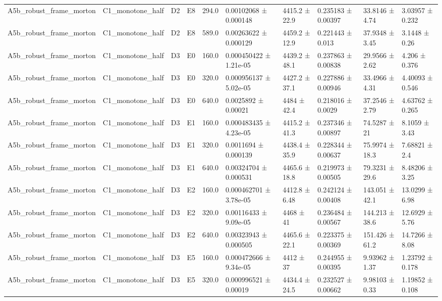 \begin{table}
\begin{tabular}{llllllllll}
A5b\_robust\_frame\_morton & C1\_monotone\_half & D2 & E8 & 294.0 & 0.00102068 ± 0.000148 & 4415.2 ± 22.9 & 0.235183 ± 0.00397 & 33.8146 ± 4.74 & 3.03957 ± 0.232 \\
A5b\_robust\_frame\_morton & C1\_monotone\_half & D2 & E8 & 589.0 & 0.00263622 ± 0.000129 & 4459.2 ± 12.9 & 0.221443 ± 0.013 & 37.9348 ± 3.45 & 3.1448 ± 0.26 \\
A5b\_robust\_frame\_morton & C1\_monotone\_half & D3 & E0 & 160.0 & 0.000450422 ± 1.21e-05 & 4439.2 ± 48.1 & 0.237863 ± 0.00838 & 29.9566 ± 2.62 & 4.206 ± 0.376 \\
A5b\_robust\_frame\_morton & C1\_monotone\_half & D3 & E0 & 320.0 & 0.000956137 ± 5.02e-05 & 4427.2 ± 37.1 & 0.227886 ± 0.00946 & 33.4966 ± 4.31 & 4.40093 ± 0.546 \\
A5b\_robust\_frame\_morton & C1\_monotone\_half & D3 & E0 & 640.0 & 0.0025892 ± 0.00021 & 4484 ± 42.4 & 0.218016 ± 0.0029 & 37.2546 ± 2.79 & 4.63762 ± 0.265 \\
A5b\_robust\_frame\_morton & C1\_monotone\_half & D3 & E1 & 160.0 & 0.000483435 ± 4.23e-05 & 4415.2 ± 41.3 & 0.237346 ± 0.00897 & 74.5287 ± 21 & 8.1059 ± 3.43 \\
A5b\_robust\_frame\_morton & C1\_monotone\_half & D3 & E1 & 320.0 & 0.0011694 ± 0.000139 & 4438.4 ± 35.9 & 0.228344 ± 0.00637 & 75.9974 ± 18.3 & 7.68821 ± 2.4 \\
A5b\_robust\_frame\_morton & C1\_monotone\_half & D3 & E1 & 640.0 & 0.00324704 ± 0.000531 & 4465.6 ± 18.8 & 0.219973 ± 0.00505 & 79.3231 ± 29.6 & 8.48206 ± 3.25 \\
A5b\_robust\_frame\_morton & C1\_monotone\_half & D3 & E2 & 160.0 & 0.000462701 ± 3.78e-05 & 4412.8 ± 6.48 & 0.242124 ± 0.00408 & 143.051 ± 42.1 & 13.0299 ± 6.98 \\
A5b\_robust\_frame\_morton & C1\_monotone\_half & D3 & E2 & 320.0 & 0.00116433 ± 9.09e-05 & 4468 ± 41 & 0.236484 ± 0.00567 & 144.213 ± 38.6 & 12.6929 ± 5.76 \\
A5b\_robust\_frame\_morton & C1\_monotone\_half & D3 & E2 & 640.0 & 0.00323943 ± 0.000505 & 4465.6 ± 22.1 & 0.223375 ± 0.00369 & 151.426 ± 61.2 & 14.7266 ± 8.08 \\
A5b\_robust\_frame\_morton & C1\_monotone\_half & D3 & E5 & 160.0 & 0.000472666 ± 9.34e-05 & 4412 ± 37 & 0.244955 ± 0.00395 & 9.93962 ± 1.37 & 1.23792 ± 0.178 \\
A5b\_robust\_frame\_morton & C1\_monotone\_half & D3 & E5 & 320.0 & 0.000996521 ± 0.00019 & 4434.4 ± 24.5 & 0.232527 ± 0.00662 & 9.98103 ± 0.33 & 1.19852 ± 0.108 \\

\end{tabular}
\end{table}
